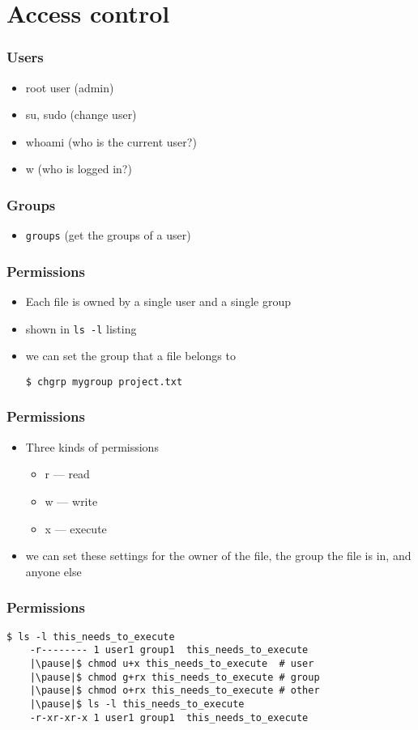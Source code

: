 \documentclass[%
        hyperref={%
                pdfauthor={Zakariyya Mughal},%
                pdfpagemode={None},pdfpagelayout={SinglePage}}%
        xcolor={x11names},%
]{beamer}
\begin{document}
\section{Access control}\frame{\insertsection}%
\begin{frame}
	\frametitle{Users}
	\begin{itemize}
		\item root user (admin)
		\pause\item su, sudo (change user)
		\pause\item whoami (who is the current user?)
		\pause\item w  (who is logged in?)
	\end{itemize}
\end{frame}
\begin{frame}
	\frametitle{Groups}
	\begin{itemize}
		\item \texttt{groups} (get the groups of a user)
	\end{itemize}
\end{frame}
\begin{frame}[fragile]
	\frametitle{Permissions}
	\begin{itemize}
		\item Each file is owned by a single user and
			a single group
		\pause\item shown in \texttt{ls~-l} listing
		\pause\item we can set the group that a file belongs to
		\begin{lstlisting}[escapeinside=||]
		$ chgrp mygroup project.txt
		\end{lstlisting}
	\end{itemize}
\end{frame}
\begin{frame}
	\frametitle{Permissions}
	\begin{itemize}
		\item Three kinds of permissions
			\begin{itemize}
				\item r --- read
				\item w --- write
				\item x --- execute
			\end{itemize}
		\pause\item we can set these settings for the
			owner of the file, the group the file is
			in, and anyone else
	\end{itemize}
\end{frame}
\begin{frame}[fragile]
	\frametitle{Permissions}
	\begin{lstlisting}[escapeinside=||]
	$ ls -l this_needs_to_execute
	-r-------- 1 user1 group1  this_needs_to_execute
	|\pause|$ chmod u+x this_needs_to_execute  # user
	|\pause|$ chmod g+rx this_needs_to_execute # group
	|\pause|$ chmod o+rx this_needs_to_execute # other
	|\pause|$ ls -l this_needs_to_execute
	-r-xr-xr-x 1 user1 group1  this_needs_to_execute
	\end{lstlisting}
\end{frame}
\end{document}
